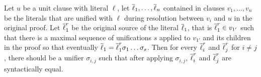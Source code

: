 \begin{property}
\label{prop:rootpair}
Let $u$ be a unit clause with literal $\ell$, let $\overline{\ell}_1,\ldots,\overline{\ell}_n$ contained in clauses $v_1,\ldots,v_n$ be the literals that are unified with $\ell$ during resolution between $v_i$ and $u$ in the original proof. Let $\overline{\ell}_1^r$ be the original source of the literal $\overline{\ell}_1$, that is $\overline{\ell}_1^r\in v_{1'}$ such that there is a maximal sequence of unifications $s$ applied to $v_{1'}$ and its children in the proof so that eventually $\overline{\ell}_1=\overline{\ell}_1^r\sigma_1\ldots\sigma_s$.
Then for every $\overline{\ell}_i^r$ and  $\overline{\ell}_j^r$ for $i\neq j$, there should be a unifier $\sigma_{i,j}$ such that after applying $\sigma_{i,j}$, $\overline{\ell}_i^r$ and $\overline{\ell}_j^r$ are syntactically equal.
\end{property}

